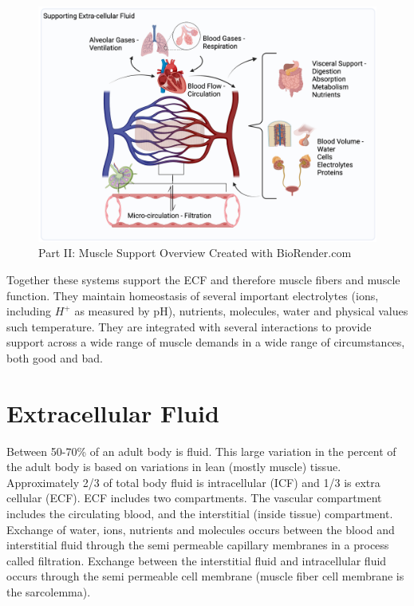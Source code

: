 \begin{figure}[!h]
    \centering
    \includegraphics[width=1\linewidth]{./figure/part2_overview.png}
    \caption{Part II: Muscle Support Overview \footnotesize{Created with BioRender.com}}
    \label{fig:part2_overview}
\end{figure}

Together these systems support the ECF and therefore muscle fibers and muscle function. They maintain homeostasis of several important electrolytes (ions, including $H^+$ as measured by pH), nutrients, molecules, water and physical values such temperature. They are integrated with several interactions to provide support across a wide range of muscle demands in a wide range of circumstances, both good and bad.

\section{Extracellular Fluid}

Between 50-70\% of an adult body is fluid. This large variation in the percent of the adult body is based on variations in lean (mostly muscle) tissue. Approximately 2/3 of total body fluid is intracellular (ICF) and 1/3 is extra cellular (ECF). ECF includes two compartments. The vascular compartment includes the circulating blood, and the interstitial (inside tissue) compartment. Exchange of water, ions, nutrients and molecules occurs between the blood and interstitial fluid through the semi permeable capillary membranes in a process called filtration. Exchange between the interstitial fluid and intracellular fluid occurs through the semi permeable cell membrane (muscle fiber cell membrane is the sarcolemma).

